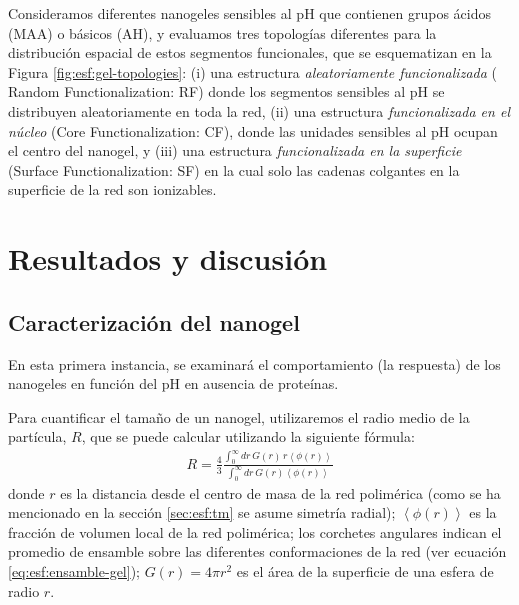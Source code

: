  
 
 Consideramos diferentes nanogeles sensibles al pH que contienen grupos \'acidos (MAA) o b\'asicos (AH), y evaluamos tres topolog\'ias diferentes para la distribuci\'on espacial de estos segmentos funcionales, que se esquematizan en la Figura \ref{fig:esf:gel-topologies}:
 (i) una estructura \emph{aleatoriamente funcionalizada} ( Random Functionalization:  RF) donde los segmentos sensibles al pH se distribuyen aleatoriamente en toda la red,
 (ii) una estructura \emph{funcionalizada en el n\'ucleo} (Core Functionalization: CF), donde las unidades sensibles al pH ocupan el centro del nanogel, y
 (iii) una estructura \emph{funcionalizada en la superficie} (Surface Functionalization: SF) en la cual solo las cadenas colgantes en la superficie de la red son ionizables.
  







\section{Resultados y discusi\'on}






\subsection{Caracterizaci\'on del nanogel}

En esta primera instancia, se examinar\'a el comportamiento (la respuesta) de los nanogeles en funci\'on del pH en ausencia de prote\'inas.

Para cuantificar el tama\~no de un nanogel, utilizaremos el radio medio de la part\'icula, $R$, que se puede calcular utilizando la siguiente f\'ormula:
\begin{align}
	R = \frac{4}{3}\frac{\int_0^\infty{dr\,G(r)\,r \left<\phi(r)\right>}}{\int_0^\infty{dr\,G(r)\left<\phi(r)\right>}}
\end{align}
\noindent donde $r$ es la distancia desde el centro de masa de la red polim\'erica (como se ha mencionado en la secci\'on \ref{sec:esf:tm} se asume simetr\'ia radial);
$\left<\phi(r)\right>$ es la fracci\'on de volumen local de la red polim\'erica;
los corchetes angulares indican el promedio de ensamble sobre las diferentes conformaciones de la red (ver ecuaci\'on \ref{eq:esf:ensamble-gel});
$G(r)=4\pi r^2$ es el \'area de la superficie de una esfera de radio $r$.

